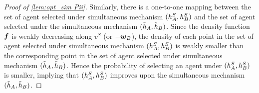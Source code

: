 \begin{proof}[Proof of \cref{lem:opt_sim Pii}]
Similarly, there is a one-to-one mapping between the set of agent selected under simultaneous mechanism $(h_A^S,h_B^S)$ and the set of agent selected under the simultaneous mechanism $(\tilde{h}_A,\tilde{h}_B)$.
Since the density function $\boldsymbol{f}$ is weakly decreasing along $v^S$ (or $-\boldsymbol{w}_B$), the density of each point in the set of agent selected under simultaneous mechanism $(h_A^S,h_B^S)$ is weakly smaller than the corresponding point in the set of agent selected under simultaneous mechanism $(\tilde{h}_A,\tilde{h}_B)$.
    Hence the probability of selecting an agent under  $(h_A^S,h_B^S)$ is smaller, implying that  $(h_A^S,h_B^S)$ improves upon the simultaneous mechanism $(\tilde{h}_A,\tilde{h}_B)$.
    
\end{proof}


